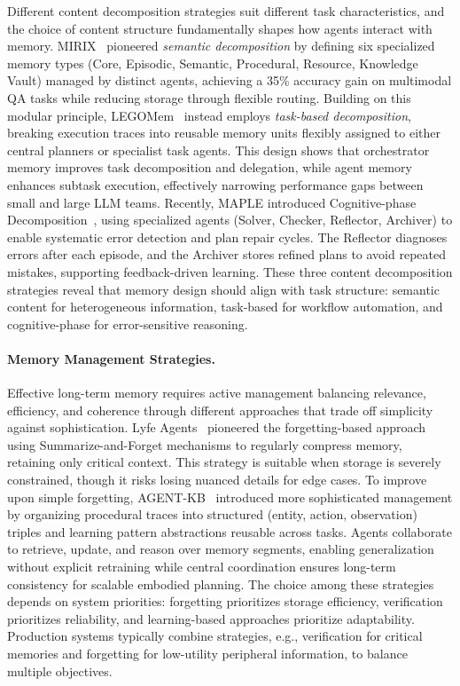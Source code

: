 Different content decomposition strategies suit different task characteristics, and the choice of content structure fundamentally shapes how agents interact with memory. 
MIRIX~\cite{wang2025mirix} pioneered \textit{semantic decomposition} by defining six specialized memory types (Core, Episodic, Semantic, Procedural, Resource, Knowledge Vault) managed by distinct agents, achieving a 35\% accuracy gain on multimodal QA tasks while reducing storage through flexible routing. 
Building on this modular principle, LEGOMem~\cite{han2025legomem} instead employs \textit{task-based decomposition}, breaking execution traces into reusable memory units flexibly assigned to either central planners or specialist task agents. 
This design shows that orchestrator memory improves task decomposition and delegation, while agent memory enhances subtask execution, effectively narrowing performance gaps between small and large LLM teams. 
Recently, MAPLE introduced Cognitive-phase Decomposition~\cite{bai2025maple}, using specialized agents (Solver, Checker, Reflector, Archiver) to enable systematic error detection and plan repair cycles. 
The Reflector diagnoses errors after each episode, and the Archiver stores refined plans to avoid repeated mistakes, supporting feedback-driven learning. 
These three content decomposition strategies reveal that memory design should align with task structure: semantic content for heterogeneous information, task-based for workflow automation, and cognitive-phase for error-sensitive reasoning.


\paragraph{Memory Management Strategies.}

Effective long-term memory requires active management balancing relevance, efficiency, and coherence through different approaches that trade off simplicity against sophistication. Lyfe Agents~\cite{kaiya2023lyfe} pioneered the forgetting-based approach using Summarize-and-Forget mechanisms to regularly compress memory, retaining only critical context. This strategy is suitable when storage is severely constrained, though it risks losing nuanced details for edge cases. To improve upon simple forgetting, AGENT-KB~\cite{tang2025agent} introduced more sophisticated management by organizing procedural traces into structured (entity, action, observation) triples and learning pattern abstractions reusable across tasks. Agents collaborate to retrieve, update, and reason over memory segments, enabling generalization without explicit retraining while central coordination ensures long-term consistency for scalable embodied planning. The choice among these strategies depends on system priorities: forgetting prioritizes storage efficiency, verification prioritizes reliability, and learning-based approaches prioritize adaptability. Production systems typically combine strategies, e.g., verification for critical memories and forgetting for low-utility peripheral information, to balance multiple objectives.

